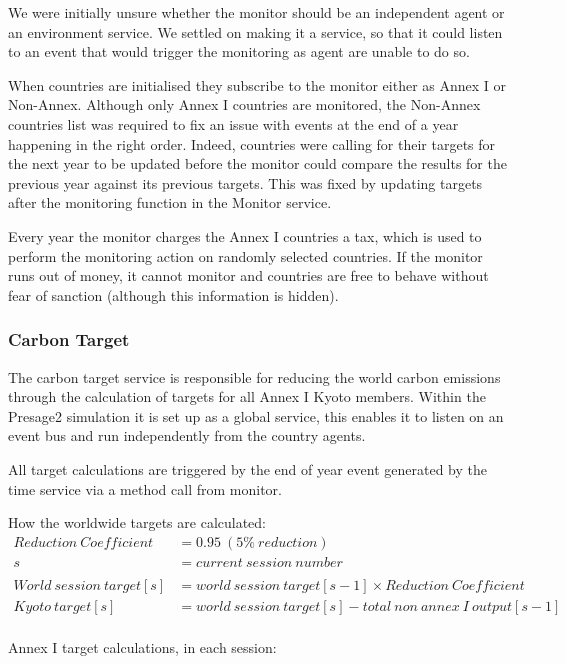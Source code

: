 We were initially unsure whether the monitor should be an independent agent or an environment service. We settled on making it a service, so that it could listen to an event that would trigger the monitoring as agent are unable to do so.

When countries are initialised they subscribe to the monitor either as Annex I or Non-Annex. Although only Annex I countries are monitored, the Non-Annex countries list was required to fix an issue with events at the end of a year happening in the right order. Indeed, countries were calling for their targets for the next year to be updated before the monitor could compare the results for the previous year against its previous targets. This was fixed by updating targets after the monitoring function in the Monitor service.

Every year the monitor charges the Annex I countries a tax, which is used to perform the monitoring action on randomly selected countries. If the monitor runs out of money, it cannot monitor and countries are free to behave without fear of sanction (although this information is hidden).

\subsubsection{Carbon Target}

The carbon target service is responsible for reducing the world carbon emissions through the calculation of targets for all Annex I Kyoto members. Within the Presage2 simulation it is set up as a global service, this enables it to listen on an event bus and run independently from the country agents.
 
All target calculations are triggered by the end of year event generated by the time service via a method call from monitor.

How the worldwide targets are calculated:
\begin{align*}
Reduction~Coefficient&= 0.95 ~ (5\%~reduction) \\
s &= current~session~number\\
\\
World~session~target[s] &= world~session~target [s - 1] \times Reduction~Coefficient\\
Kyoto~target [s] &= world~session~target [s] - total~non~annex~I~output [s - 1]\\
\end{align*}

Annex I target calculations, in each session:

